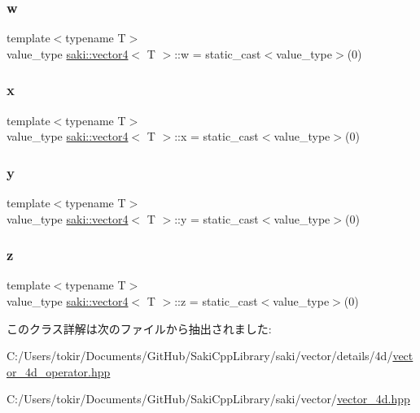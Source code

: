 \subsubsection{\texorpdfstring{w}{w}}
{\footnotesize\ttfamily template$<$typename T$>$ \\
value\+\_\+type \mbox{\hyperlink{classsaki_1_1vector4}{saki\+::vector4}}$<$ T $>$\+::w = static\+\_\+cast$<$value\+\_\+type$>$(0)}

\mbox{\label{classsaki_1_1vector4_a8b2ff4254dd0ba142490c77927bfbf8e}} 
\subsubsection{\texorpdfstring{x}{x}}
{\footnotesize\ttfamily template$<$typename T$>$ \\
value\+\_\+type \mbox{\hyperlink{classsaki_1_1vector4}{saki\+::vector4}}$<$ T $>$\+::x = static\+\_\+cast$<$value\+\_\+type$>$(0)}

\mbox{\label{classsaki_1_1vector4_a827cd630cd250d5fe85290f6671dbe0b}} 
\subsubsection{\texorpdfstring{y}{y}}
{\footnotesize\ttfamily template$<$typename T$>$ \\
value\+\_\+type \mbox{\hyperlink{classsaki_1_1vector4}{saki\+::vector4}}$<$ T $>$\+::y = static\+\_\+cast$<$value\+\_\+type$>$(0)}

\mbox{\label{classsaki_1_1vector4_a42ece0235847ec6ee945516d4dc3ab48}} 
\subsubsection{\texorpdfstring{z}{z}}
{\footnotesize\ttfamily template$<$typename T$>$ \\
value\+\_\+type \mbox{\hyperlink{classsaki_1_1vector4}{saki\+::vector4}}$<$ T $>$\+::z = static\+\_\+cast$<$value\+\_\+type$>$(0)}



このクラス詳解は次のファイルから抽出されました\+:\begin{DoxyCompactItemize}
\item 
C\+:/\+Users/tokir/\+Documents/\+Git\+Hub/\+Saki\+Cpp\+Library/saki/vector/details/4d/\mbox{\hyperlink{vector__4d__operator_8hpp}{vector\+\_\+4d\+\_\+operator.\+hpp}}\item 
C\+:/\+Users/tokir/\+Documents/\+Git\+Hub/\+Saki\+Cpp\+Library/saki/vector/\mbox{\hyperlink{vector__4d_8hpp}{vector\+\_\+4d.\+hpp}}\end{DoxyCompactItemize}
